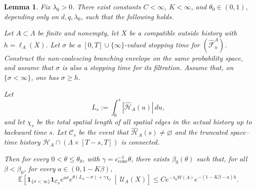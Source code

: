 \documentclass[letterpaper,11pt,reqno]{amsart}
\newtheorem{lemma}[thm]{Lemma}
\theoremstyle{definition}
\begin{document}
\begin{lemma}
\label{lem:stopped-weighted-red}
Fix \(\lambda_0>0\). There exist
constants \(C<\infty\), \(K<\infty\), and \(\theta_0\in(0,1)\), depending only on
\(d,q,\lambda_0\), such that the following holds.

Let \(A\subset\Lambda\) be finite and nonempty, let \(X\) be a compatible outside history with \(h=\ell_A(X)\). Let \(\sigma\) be a \([0,T]\cup\{\infty\}\)-valued stopping time for \((\widehat{\mathscr F}_u^A)\). Construct the non-coalescing branching envelope on the same probability space, and assume that \(\sigma\) is also a stopping time for its filtration.
Assume that, on \(\{\sigma<\infty\}\), one has \(\sigma\ge h\).


Let
\[
        L_s:=\int_0^s |\widehat{\mathcal H}_A(u)|\,du,
\]
and let \(\chi_s\) be the total spatial length of all spatial edges in the actual history up to backward time $s$. Let \(\mathcal C_s\) be the event that \(\widehat{\mathcal H}_A(s)\ne\varnothing\) and the truncated space--time history $\mathcal H_A\cap(\Lambda\times[T-s,T])$ is connected.


Then for every \(0<\theta\le\theta_0\), with \(\gamma=c_{\mathrm{cone}}^{-1}\theta\), there exists $\beta_0(\theta)$ such that, for all $\beta<\beta_0$, for every \(a\in(0,1-K\beta)\),
\begin{equation*}
\mathbb E
\left[
\mathbf 1_{\{\sigma<\infty\}}\mathbf 1_{\mathcal C_\sigma}
e^{a\sigma}
e^{\theta(L_\sigma-\sigma)+\gamma\chi_\sigma}
\,\middle|\,
\mathcal U_A(X)
\right]
\le
C e^{-\lambda_0 W(A)}
e^{-(1-K\beta-a)h}.
\end{equation*}

\end{lemma}
\end{document}
